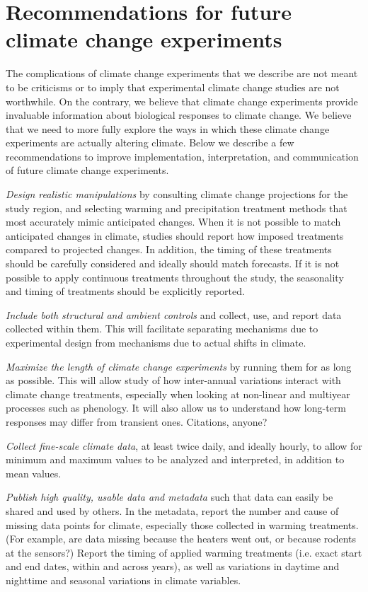 \documentclass{article}
\begin{document}
\section* {Recommendations for future climate change experiments}
 \par The complications of climate change experiments that  we describe are not meant to be criticisms or to imply that experimental climate change studies are not worthwhile. On the contrary, we believe that climate change experiments provide invaluable information about biological responses to climate change. We believe that we need to more fully explore the ways in which these climate change experiments are actually altering climate. Below we describe a few recommendations to improve implementation, interpretation, and communication of future climate change experiments.
\par\textit{Design realistic manipulations} by consulting climate change projections for the study region, and selecting warming and precipitation treatment methods that most accurately mimic anticipated changes. When it is not possible to match anticipated changes in climate, studies should report how imposed treatments compared to projected changes. In addition, the timing of these treatments should be carefully considered and ideally should match forecasts. If it is not possible to apply continuous treatments throughout the study, the seasonality and timing of treatments should be explicitly reported.
\par\textit{Include both structural and ambient controls} and collect, use, and report data collected within them. This will facilitate separating mechanisms due to experimental design from mechanisms due to actual shifts in climate.  
\par\textit{Maximize the length of climate change experiments} by running them for as long as possible. This will allow study of how inter-annual variations interact with climate change treatments, especially when looking at non-linear and multiyear processes such as phenology. It will also allow us to understand how long-term responses may differ from  transient ones. Citations, anyone?
\par\textit{Collect fine-scale climate data}, at least twice daily, and ideally hourly, to allow for minimum and maximum values to be analyzed and interpreted, in addition to mean values.
 \par\textit{Publish high quality, usable data and metadata} such that data can easily be shared and used by others. In the metadata, report the number and cause of missing data points for climate, especially those collected in warming treatments. (For example, are data missing because the heaters went out, or because rodents at the sensors?) Report the timing of applied warming treatments (i.e. exact start and end dates, within and across years), as well as variations in daytime and nighttime and seasonal variations in climate variables. 
\end{document}
